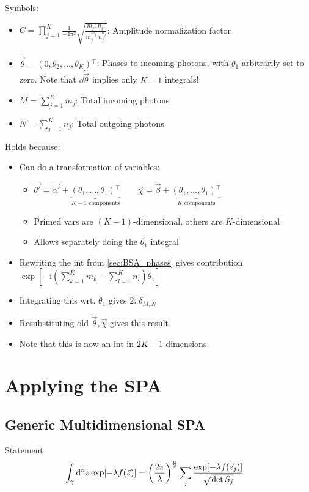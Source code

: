 \documentclass[
	english,
	a4paper,
	fontsize=10pt,
	parskip=half,
	titlepage=true,
	DIV=12,
	final
]{scrreprt}
\newcommand*{\transp}{\ensuremath{^\intercal}}
\newcommand*{\iunit}{\ensuremath{\mathrm{i}}}
\begin{document}
Symbols:
\begin{itemize}
\item $C = \prod_{j=1}^{K} 
	\frac{1}{-4\pi^{2}}
	\sqrt{\frac
			{m_j!      \; n_j!}
			{m_j^{m_j} \; n_j^{n_j} }}$:
	Amplitude normalization factor
\item $\tilde{\vec{\theta}} = (0, \theta_2, \ldots, \theta_K)\transp$:
	Phases to incoming photons, with $\theta_1$ arbitrarily set to zero. \newline
	Note that $\dd{\tilde{\vec{\theta}}}$ implies only $K-1$ integrals!
\item $M = \sum_{j=1}^{K} m_j$: Total incoming photons
\item $N = \sum_{j=1}^{K} n_j$: Total outgoing photons
\end{itemize}

Holds because:
\begin{itemize}
\item Can do a transformation of variables:
	\begin{itemize}
	\item $\vec{\theta'} = \vec{\alpha'} + 
			\underbrace{(\theta_1, \ldots, \theta_1)\transp}_{K-1 \text{ components}}
		\qquad
			\vec{\chi}    = \vec{\beta}   + 
			\underbrace{(\theta_1, \ldots, \theta_1)\transp}_{K \text{ components}}
		$
	\item Primed vars are $(K-1)$-dimensional, others are $K$-dimensional
	\item Allows separately doing the $\theta_1$ integral
	\end{itemize}
\item Rewriting the int from \ref{sec:BSA_phases} gives contribution
	$\exp[-\iunit(\sum_{k=1}^{K} m_k - \sum_{l=1}^{K} n_l)\theta_1]$
\item Integrating this wrt. $\theta_1$ gives $2\pi \delta_{M,N}$
\item Resubstituting old $\vec{\theta}, \vec{\chi}$ gives this result.
\item Note that this is now an int in $2K - 1$ dimensions.
\end{itemize}

\chapter{Applying the SPA}
\section{Generic Multidimensional SPA}
Statement
\begin{align}
	\int_{\gamma} \dd[n]{z}
		\exp[-\lambda f(\vec{z})]
&=
	\qty(
		\frac{2\pi}{\lambda}
	)^{\frac{n}{2}}
	\sum_j
		\frac
		{\exp[-\lambda f(\vec{z}_j)]}
		{\sqrt{\det S_j}}
\label{eqn:genericSPA}
\end{align}
\end{document}
